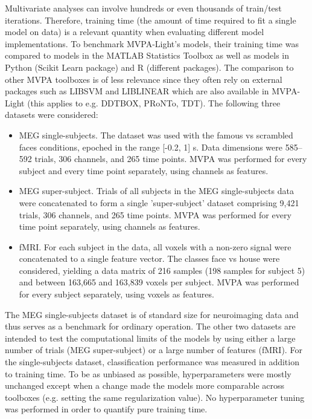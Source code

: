\documentclass[utf8]{frontiersSCNS} %
\begin{document}
Multivariate analyses can involve hundreds or even thousands of train/test iterations. Therefore,  training time (the amount of time required to fit a single model on data) is a relevant quantity when evaluating different model implementations. To benchmark MVPA-Light's models, their training time was compared to models in the MATLAB Statistics Toolbox as well as models in Python (Scikit Learn package) and R (different packages). The comparison to other MVPA toolboxes is of less relevance since they often rely on external packages such as LIBSVM and LIBLINEAR which are also available in MVPA-Light (this applies to e.g. DDTBOX, PRoNTo, TDT). The following three datasets were considered:


\begin{itemize}
    \item MEG single-subjects. The \cite{Wakeman2015ADataset} dataset was used with the famous vs scrambled faces conditions, epoched in the range [-0.2, 1] s. Data dimensions were 585--592 trials, 306 channels, and 265 time points. MVPA was performed for every subject and every time point separately, using channels as features.
    \item MEG super-subject. Trials of all subjects in the MEG single-subjects data were concatenated to form a single 'super-subject' dataset comprising 9,421 trials, 306 channels, and 265 time points. MVPA was performed for every time point separately, using channels as features.
    \item fMRI. For each subject in the \cite{Haxby2001} data, all voxels with a non-zero signal were concatenated to a single feature vector. The classes face vs house were considered, yielding a data matrix of 216 samples (198 samples for subject 5) and between 163,665 and 163,839 voxels per subject. MVPA was performed for every subject separately, using voxels as features.
\end{itemize}

The MEG single-subjects dataset is of standard size for neuroimaging data and thus serves as a benchmark for ordinary operation. The other two datasets are intended to test the computational limits of the models by using either a large number of trials (MEG super-subject) or a large number of features (fMRI). For the single-subjects dataset, classification performance was measured in addition to training time.
To be as unbiased as possible, hyperparameters were mostly unchanged except when a change made the models more comparable across toolboxes (e.g. setting the same regularization value). No hyperparameter tuning was performed in order to quantify pure training time.
\end{document}
